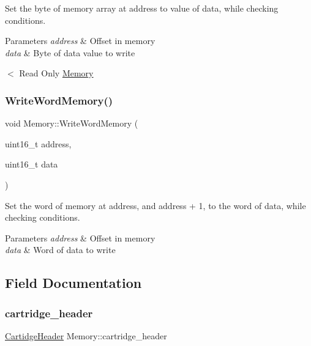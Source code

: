 Set the byte of memory array at address to value of data, while checking conditions. 


\begin{DoxyParams}{Parameters}
{\em address} & Offset in memory \\
\hline
{\em data} & Byte of data value to write \\
\hline
\end{DoxyParams}
$<$ Read Only \mbox{\hyperlink{classMemory}{Memory}} \mbox{\label{classMemory_a64cd99f25f9224f17c0a5ee3aaba2887}} 
\subsubsection{\texorpdfstring{Write\+Word\+Memory()}{WriteWordMemory()}}
{\footnotesize\ttfamily void Memory\+::\+Write\+Word\+Memory (\begin{DoxyParamCaption}\item[{uint16\+\_\+t}]{address,  }\item[{uint16\+\_\+t}]{data }\end{DoxyParamCaption})}



Set the word of memory at address, and address + 1, to the word of data, while checking conditions. 


\begin{DoxyParams}{Parameters}
{\em address} & Offset in memory \\
\hline
{\em data} & Word of data to write \\
\hline
\end{DoxyParams}


\subsection{Field Documentation}
\mbox{\label{classMemory_a6459c5b106a92a3f24673a3448a1bab0}} 
\subsubsection{\texorpdfstring{cartridge\+\_\+header}{cartridge\_header}}
{\footnotesize\ttfamily \mbox{\hyperlink{structCartidgeHeader}{Cartidge\+Header}} Memory\+::cartridge\+\_\+header}

